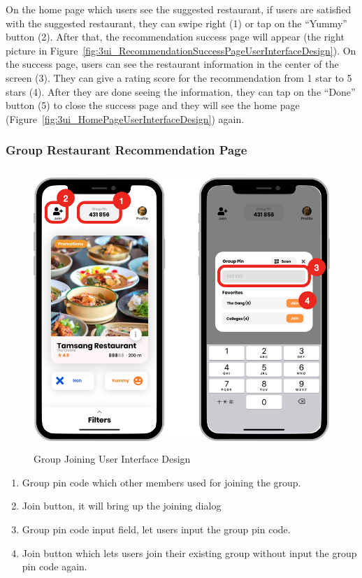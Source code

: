\documentclass[12pt,oneside,openright,a4paper]{cpe-english-project}
\begin{document}
On the home page which users see the suggested restaurant, if users are satisfied with the suggested restaurant, they can swipe right (1) or tap on the “Yummy” button (2). After that, the recommendation success page will appear (the right picture in Figure~\ref{fig:3ui_RecommendationSuccessPageUserInterfaceDesign}). On the success page, users can see the restaurant information in the center of the screen (3). They can give a rating score for the recommendation from 1 star to 5 stars (4). After they are done seeing the information, they can tap on the “Done” button (5) to close the success page and they will see the home page (Figure~\ref{fig:3ui_HomePageUserInterfaceDesign}) again.

\newpage
\subsubsection{Group Restaurant Recommendation Page}
\begin{figure}[H]\centering
\includegraphics[height=300pt]{./images/3ui_GroupJoiningUserInterfaceDesign.png}
\caption{Group Joining User Interface Design}\label{fig:3ui_GroupJoiningUserInterfaceDesign}
\end{figure}\vspace{-24pt}

\begin{enumerate}
\item Group pin code which other members used for joining the group.
\item Join button, it will bring up the joining dialog
\item Group pin code input field, let users input the group pin code.
\item Join button which lets users join their existing group without input the group pin code again.
\end{enumerate}
\end{document}
